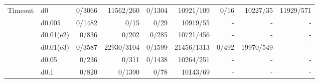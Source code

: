\begin{table}[htbp]
\begin{tabular}{llrrrrrrr}
		\multirow{5}{*}{Timeout}
		& d0
		& 0/3066 & 11562/260 & 0/1304
		& 10921/109 & 0/16 & 10227/35
		& 11929/571 \\

		& d0.005
		& 0/1482 & 0/15 & 0/29
		& 10919/55 & - & -
		& - \\

		& d0.01(e2)
		& 0/836 & 0/202 & 0/285
		& 10721/456 & - & -
		& - \\

		& d0.01(e3)
		& 0/3587 & 22930/3104 & 0/1599
		& 21456/1313 & 0/492 & 19970/549
		& - \\

		& d0.05
		& 0/236 & 0/311 & 0/1438
		& 10264/251 & - & -
		& - \\

		& d0.1
		& 0/820 & 0/1390 & 0/78
		& 10143/69 & - & -
		& - \\

		\bottomrule
	\end{tabular}
	\vspace{0.3em}
\end{table}